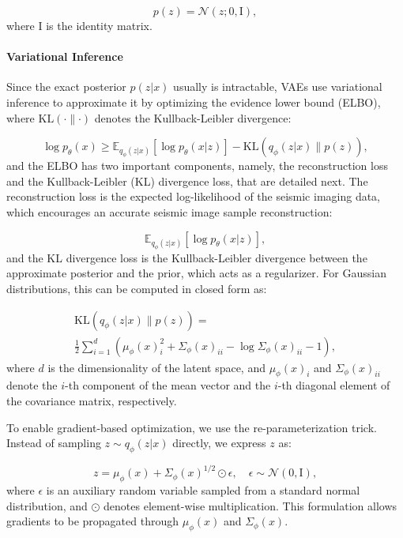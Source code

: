 ﻿\documentclass{ieeeaccess}
\begin{document}
\begin{equation}
p(z) = \mathcal{N}(z; 0, \mathrm{I}),
\end{equation}
where $\mathrm{I}$ is the identity matrix.

\paragraph{Variational Inference} 
Since the exact posterior $p(z | x)$ usually is intractable, VAEs use variational inference to approximate it by optimizing the evidence lower bound (ELBO), where $\text{KL}(\cdot \parallel \cdot)$ denotes the Kullback-Leibler divergence:

\begin{equation}
\log p_\theta(x) \geq \mathbb{E}_{q_\phi(z | x)} \left[ \log p_\theta(x | z) \right] - \text{KL}(q_\phi(z | x) \parallel p(z)),
\end{equation}
and the ELBO has two important components, namely, the reconstruction loss and the Kullback-Leibler (KL) divergence loss, that are detailed next. The reconstruction loss is the expected log-likelihood of the seismic imaging data, which encourages an accurate seismic image sample reconstruction:

\begin{equation}
\mathbb{E}_{q_\phi(z | x)} \left[ \log p_\theta(x | z) \right],
\end{equation}
and the KL divergence loss is the Kullback-Leibler divergence between the approximate posterior and the prior, which acts as a regularizer. For Gaussian distributions, this can be computed in closed form as:

\begin{equation}
\begin{aligned}
\text{KL}(q_\phi(z | x) \parallel p(z))
=  \\
\frac{1}{2} \sum_{i=1}^{d} \left( \mu_\phi(x)_i^2 + \Sigma_\phi(x)_{ii} - \log \Sigma_\phi(x)_{ii} - 1 \right),
\end{aligned}
\end{equation}
where $d$ is the dimensionality of the latent space, and $\mu_\phi(x)_i$ and $\Sigma_\phi(x)_{ii}$ denote the $i$-th component of the mean vector and the $i$-th diagonal element of the covariance matrix, respectively.

To enable gradient-based optimization, we use the re-parameterization trick. Instead of sampling $z \sim q_\phi(z | x)$ directly, we express $z$ as:

\begin{equation}
z = \mu_\phi(x) + \Sigma_\phi(x)^{1/2} \odot \epsilon, \quad \epsilon \sim \mathcal{N}(0, \mathrm{I}),
\end{equation}
where $\epsilon$ is an auxiliary random variable sampled from a standard normal distribution, and $\odot$ denotes element-wise multiplication. This formulation allows gradients to be propagated through $\mu_\phi(x)$ and $\Sigma_\phi(x)$.
\end{document}
